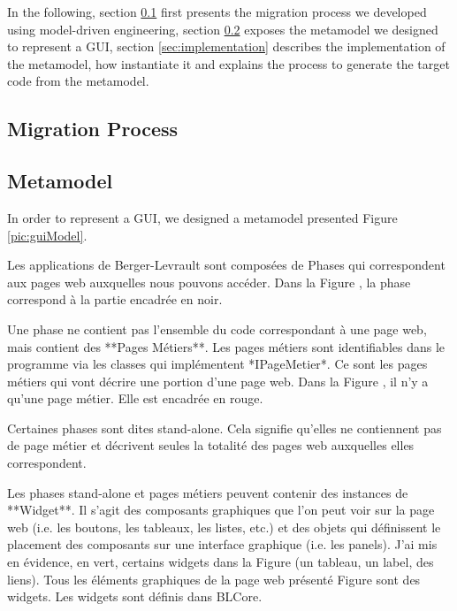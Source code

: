 \documentclass[conference]{IEEEtran}
\begin{document}
    In the following, section \ref{sec:migrationProcess} first presents the migration process we developed using model-driven engineering,
    section \ref{sec:metamodel} exposes the metamodel we designed to represent a GUI,
    section \ref{sec:implementation} describes the implementation of the metamodel, 
        how instantiate it and
        explains the process to generate the target code from the metamodel.

    \subsection{Migration Process}
    \label{sec:migrationProcess}

    
    \subsection{Metamodel}
    \label{sec:metamodel}

    In order to represent a GUI, we designed a metamodel presented Figure \ref{pic:guiModel}.


    Les applications de Berger-Levrault sont composées de Phases qui correspondent aux pages web auxquelles nous pouvons accéder.
    Dans la Figure , la phase correspond à la partie encadrée en noir.
    
    Une phase ne contient pas l'ensemble du code correspondant à une page web,
  mais contient des **Pages Métiers**.
Les pages métiers sont identifiables dans le programme via les classes qui implémentent *IPageMetier*.
Ce sont les pages métiers qui vont décrire une portion d'une page web.
Dans la Figure , il n'y a qu'une page métier.
Elle est encadrée en rouge.

Certaines phases sont dites stand-alone.
Cela signifie qu'elles ne contiennent pas de page métier et décrivent seules
  la totalité des pages web auxquelles elles correspondent.

Les phases stand-alone et pages métiers peuvent contenir des instances de **Widget**.
Il s'agit des composants graphiques que l'on peut voir sur la page web (i.e. les boutons, les tableaux, les listes, etc.)
  et des objets qui définissent le placement des composants sur une interface graphique (i.e. les panels).
J'ai mis en évidence, en vert, certains widgets dans la Figure  (un tableau, un label, des liens).
Tous les éléments graphiques de la page web présenté Figure  sont des widgets.
Les widgets sont définis dans BLCore.
\end{document}
